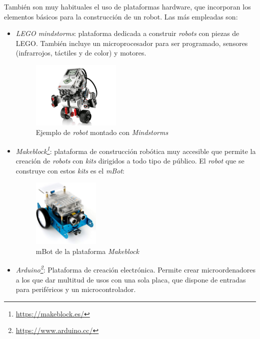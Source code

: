 También son muy habituales el uso de plataformas hardware, que incorporan los elementos básicos para la construcción de un robot. Las más empleadas son: 
\begin{itemize}
    \item \textit{LEGO mindstorms}: plataforma dedicada a construir \textit{robots} con piezas de LEGO. También incluye un microprocesador para ser programado, sensores (infrarrojos, táctiles y de color) y motores.
            \begin{figure}[H]
        \centering
        \includegraphics[width=0.4\textwidth]{img/legomind.jpg}
        \caption{Ejemplo de \textit{robot} montado con \textit{Mindstorms}} \label{fig:lego}
    \end{figure}
    \item \textit{Makeblock\footnote{\url{https://makeblock.es/}}}: plataforma de construcción robótica muy accesible que permite la creación de \textit{robots} con \textit{kits} dirigidos a todo tipo de público. El \textit{robot} que se construye con estos \textit{kits} es el \textit{mBot}:
        \begin{figure}[H]
        \centering
        \includegraphics[width=0.3\textwidth]{img/mBotReal.jpg}
        \caption{mBot de la plataforma \textit{Makeblock}} \label{fig:makeblock}
    \end{figure}
    
    \item \textit{Arduino\footnote{\url{https://www.arduino.cc/}}}: Plataforma de creación electrónica. Permite crear microordenadores a los que dar multitud de usos con una sola placa, que dispone de entradas para periféricos y un microcontrolador.
    
\end{itemize}{}